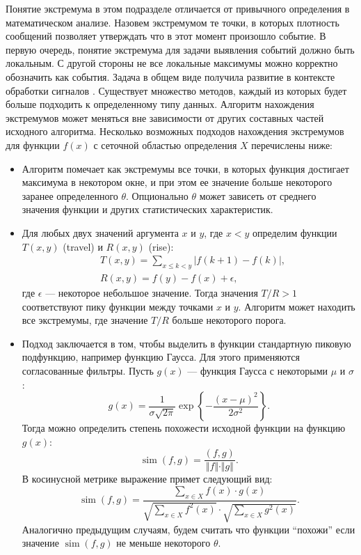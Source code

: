 \documentclass[14pt,a4paper,oneside]{extarticle}
\DeclareMathOperator{\simu}{sim}
\begin{document}
  Понятие экстремума в этом подразделе отличается от привычного определения в математическом анализе. Назовем экстремумом те точки, в которых плотность сообщений позволяет утверждать что в этот момент произошло событие. В первую очередь, понятие экстремума для задачи выявления событий должно быть локальным. С другой стороны не все локальные максимумы можно корректно обозначить как события. Задача в общем виде получила развитие в контексте обработки сигналов \cite{peak-detection}. Существует множество методов, каждый из которых будет больше подходить к определенному типу данных. Алгоритм нахождения экстремумов может меняться вне зависимости от других составных частей исходного алгоритма. Несколько возможных подходов нахождения экстремумов для функции $f(x)$ с сеточной областью определения $X$ перечислены ниже:
  \begin{itemize}
	\item  
	Алгоритм помечает как экстремумы все точки, в которых функция достигает максимума в некотором окне, и при этом ее значение больше некоторого заранее определенного $\theta$. Опционально $\theta$ может зависеть от среднего значения функции и других статистических характеристик.
	\item
  	Для любых двух значений аргумента $x$ и $y$, где $x < y$ определим функции $T(x,y)$ (travel) и $R(x,y)$ (rise):
  	\begin{equation}
  	\begin{aligned}
	  	& T(x, y) = \sum_{x \leq k < y} \left\vert f(k + 1) - f(k) \right\vert, \\
	  	& R(x, y) = f(y) - f(x) + \epsilon,
	\end{aligned}
  	\end{equation}
  	где $\epsilon$ --- некоторое небольшое значение. Тогда значения $T/R>1$ соответствуют пику функции между точками $x$ и $y$. Алгоритм может находить все экстремумы, где значение $T/R$ больше некоторого порога.
  	
  	\item
  	Подход заключается в том, чтобы выделить в функции стандартную пиковую подфункцию, например функцию Гаусса. Для этого применяются согласованные фильтры. Пусть $g(x)$ --- функция Гаусса с некоторыми $\mu$ и $\sigma$:
\begin{equation}
  	g(x) = \frac{1}{\sigma \sqrt{2\pi}} \exp\left\{ -\frac{(x-\mu)^2}{2 \sigma^2} \right\}.
  	\end{equation}  	
  	Тогда можно определить степень похожести исходной функции на функцию $g(x)$:
  	\begin{equation}
  	\simu(f,g) = \frac{\left(f,g\right)}{\Vert f \Vert \cdot \Vert g \Vert}.
  	\end{equation}
  	В косинусной метрике выражение примет следующий вид:
  	\begin{equation}
  	\simu(f,g) = \frac{\sum\limits_{x \in X} f(x) \cdot g(x)}{\sqrt{\sum\limits_{x \in X}^{\,} f^2(x)} \cdot \sqrt{\sum\limits_{x \in X}^{\,} g^2(x)}}.
  	\end{equation}
  	Аналогично предыдущим случаям, будем считать что функции ``похожи'' если значение $\simu(f,g)$ не меньше некоторого $\theta$.
  	

\end{itemize}
\end{document}
